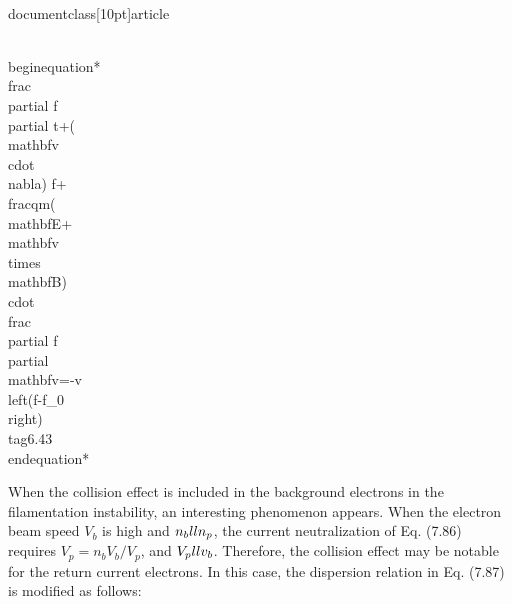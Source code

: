 \\documentclass[10pt]{article}
\begin{document}
{{{{\\begin{equation*}
\\frac{\\partial f}{\\partial t}+(\\mathbf{v} \\cdot \\nabla) f+\\frac{q}{m}(\\mathbf{E}+\\mathbf{v} \\times \\mathbf{B}) \\cdot \\frac{\\partial f}{\\partial \\mathbf{v}}=-v\\left(f-f_{0}\\right) \\tag{6.43}
\\end{equation*}


When the collision effect is included in the background electrons in the filamentation instability, an interesting phenomenon appears. When the electron beam speed $V_{b}$ is high and $n_{b} \\ll n_{p}$, the current neutralization of Eq. (7.86) requires $V_{p}=n_{b} V_{b} / V_{p}$, and $V_{p} \\ll v_{b}$. Therefore, the collision effect may be notable for the return current electrons. In this case, the dispersion relation in Eq. (7.87) is modified as follows:


}}}}
\end{document}
